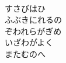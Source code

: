 \documentclass[10pt,b5j]{tarticle} %
\begin{document}
\begin{enumerate}
\begin{minipage}[c]{\blocksize}
        \vspace{\linespace}
        \item~\\
        すさびはひ\\
        ふぶきにれるの\\
        ぞわれらがぎめ\\
        いざわがよく\\
        またむのへ
    
    \end{minipage}
\end{enumerate} %
\end{document}
